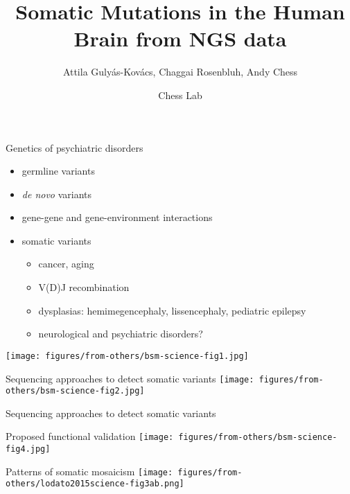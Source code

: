 \documentclass{beamer}
\title{Somatic Mutations in the Human Brain from NGS data}
\author{Attila Guly\'{a}s-Kov\'{a}cs, Chaggai Rosenbluh, Andy Chess}
\date{Chess Lab}
\begin{document}
\maketitle

\begin{frame}{Genetics of psychiatric disorders}
\begin{itemize}
\item germline variants
\item \textit{de novo} variants
\item<2-> gene-gene and gene-environment interactions  
\item<3-> somatic variants
\begin{itemize}
\item cancer, aging
\item V(D)J recombination
\item dysplasias: hemimegencephaly, lissencephaly, pediatric epilepsy 
\item<4-> \alert{neurological and psychiatric disorders?}
\end{itemize}
\end{itemize}
\end{frame}

\begin{frame}
\texttt{[image: figures/from-others/bsm-science-fig1.jpg]}
\end{frame}

\begin{frame}[label=bsm-methods]{Sequencing approaches to detect somatic variants}
\texttt{[image: figures/from-others/bsm-science-fig2.jpg]}
\end{frame}

\begin{frame}{Sequencing approaches to detect somatic variants}
\end{frame}

\begin{frame}{Proposed functional validation}
\texttt{[image: figures/from-others/bsm-science-fig4.jpg]}
\end{frame}

\begin{frame}{Patterns of somatic mosaicism}
\texttt{[image: figures/from-others/lodato2015science-fig3ab.png]}
\end{frame}
\end{document}

